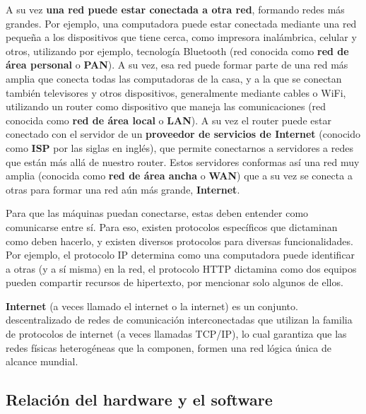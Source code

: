  A su vez \textbf{una red puede
estar conectada a otra red}, formando redes más grandes. Por ejemplo, una
computadora puede estar conectada mediante una red pequeña a los dispositivos
que tiene cerca, como impresora inalámbrica, celular y otros, utilizando por
ejemplo, tecnología Bluetooth (red conocida como \textbf{red de área personal} o
\textbf{PAN}). A su vez, esa red puede formar parte de una red más amplia que
conecta todas las computadoras de la casa, y a la que se conectan también
televisores y otros dispositivos, generalmente mediante cables o WiFi,
utilizando un router como dispositivo que maneja las comunicaciones (red
conocida como \textbf{red de área local} o \textbf{LAN}). A su vez el router
puede estar conectado con el servidor de un \textbf{proveedor de servicios de
Internet} (conocido como \textbf{ISP} por las siglas en inglés), que permite
conectarnos a servidores a redes que están más allá de nuestro router. Estos
servidores conformas así una red muy amplia (conocida como \textbf{red de área
ancha} o \textbf{WAN}) que a su vez se conecta a otras para formar una red aún
más grande, \textbf{Internet}.

Para que las máquinas puedan conectarse, estas deben entender como comunicarse
entre sí. Para eso, existen protocolos específicos que dictaminan como deben
hacerlo, y existen diversos protocolos para diversas funcionalidades. Por
ejemplo, el protocolo IP determina como una computadora puede identificar a
otras (y a sí misma) en la red, el protocolo HTTP dictamina como dos equipos
pueden compartir recursos de hipertexto, por mencionar solo algunos de ellos.

\begin{definition} \textbf{Internet} (a veces llamado el
    internet o la internet) es un conjunto. descentralizado de redes de
    comunicación interconectadas que utilizan la familia de protocolos de
    internet (a veces llamadas TCP/IP), lo cual garantiza que las redes físicas
    heterogéneas que la componen, formen una red lógica única de alcance
    mundial.\autocite[vid. p. 256]{downing_2009}
\end{definition}

\subsection{Relación del hardware y el software}
\label{chap:computadoras:subsec:relacion}

